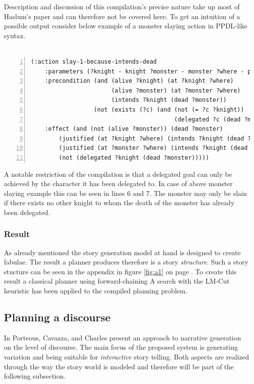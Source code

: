 Description and discussion of this compilation's precise nature take up most of Haslum's paper \cite{Haslum14} and can therefore not be covered here. To get an intuition of a possible output consider below example of a monster slaying action in PPDL-like syntax.\\
\\
\begin{lstlisting}[frame=single,basicstyle=\scriptsize,numbers=left,numberstyle=\tiny]
(:action slay-1-because-intends-dead
    :parameters (?knight - knight ?monster - monster ?where - place)
    :precondition (and (alive ?knight) (at ?knight ?where)
                       (alive ?monster) (at ?monster ?where)
                       (intends ?knight (dead ?monster))
                  (not (exists (?c) (and (not (= ?c ?knight))
                                         (delegated ?c (dead ?monster))))))
    :effect (and (not (alive ?monster)) (dead ?monster)
        (justified (at ?knight ?where) (intends ?knight (dead ?monster)))
        (justified (at ?monster ?where) (intends ?knight (dead ?monster)))
        (not (delegated ?knight (dead ?monster)))))
\end{lstlisting}
A notable restriction of the compilation is that a delegated goal can only be achieved by the character it has been delegated to. In case of above monster slaying example this can be seen in lines 6 and 7. The monster may only be slain if there exists no other knight to whom the death of the monster has already been delegated.
\subsubsection{Result}
As already mentioned the story generation model at hand is designed to create fabulae. The result a planner produces therefore is a story \emph{structure}. Such a story stucture can be seen in the appendix in figure \ref{fig:a1} on page \pageref{fig:a2}. To create this result a classical planner using forward-chaining A\text{*} search with the LM-Cut heuristic has been applied to the compiled planning problem.

\subsection{Planning a discourse}\label{discourse}
In \cite{Porteous10} Porteous, Cavazza, and Charles present an approach to narrative generation on the level of discourse. The main focus of the proposed system is generating variation and being suitable for \emph{interactive} story telling. Both aspects are realized through the way the story world is modeled and therefore will be part of the following subsection.
